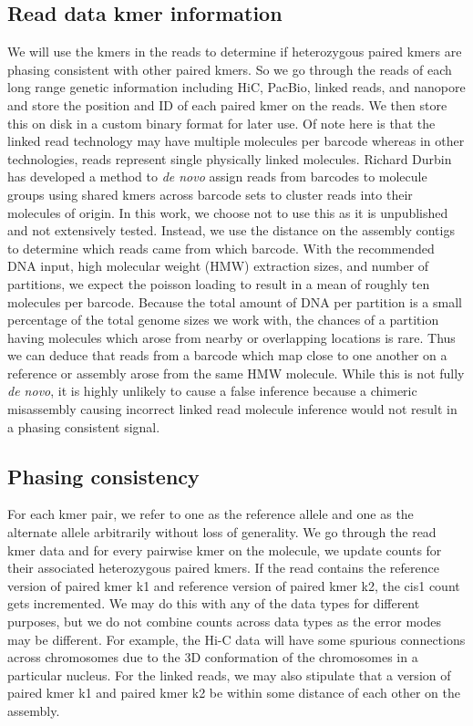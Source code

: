 \subsection{Read data kmer information}
\par{
We will use the kmers in the reads to determine if heterozygous paired kmers are phasing consistent with other paired kmers. So we go through the reads of each long range genetic information including HiC, PacBio, linked reads, and nanopore and store the position and ID of each paired kmer on the reads. We then store this on disk in a custom binary format for later use. Of note here is that the linked read technology may have multiple molecules per barcode whereas in other technologies, reads represent single physically linked molecules. Richard Durbin has developed a method to \textit{de novo} assign reads from barcodes to molecule groups using shared kmers across barcode sets to cluster reads into their molecules of origin\cite{hash10x}. In this work, we choose not to use this as it is unpublished and not extensively tested. Instead, we use the distance on the assembly contigs to determine which reads came from which barcode. With the recommended DNA input, high molecular weight (HMW) extraction sizes, and number of partitions, we expect the poisson loading to result in a mean of roughly ten molecules per barcode. Because the total amount of DNA per partition is a small percentage of the total genome sizes we work with, the chances of a partition having molecules which arose from nearby or overlapping locations is rare. Thus we can deduce that reads from a barcode which map close to one another on a reference or assembly arose from the same HMW molecule. While this is not fully \textit{de novo}, it is highly unlikely to cause a false inference because a chimeric misassembly causing incorrect linked read molecule inference would not result in a phasing consistent signal.
}

\subsection{Phasing consistency}
\par{
For each kmer pair, we refer to one as the reference allele and one as the alternate allele arbitrarily without loss of generality. We go through the read kmer data and for every pairwise kmer on the molecule, we update counts for their associated heterozygous paired kmers. If the read contains the reference version of paired kmer k1 and reference version of paired kmer k2, the cis1 count gets incremented. We may do this with any of the data types for different purposes, but we do not combine counts across data types as the error modes may be different. For example, the Hi-C data will have some spurious connections across chromosomes due to the 3D conformation of the chromosomes in a particular nucleus. For the linked reads, we may also stipulate that a version of paired kmer k1 and paired kmer k2 be within some distance of each other on the assembly.
}
